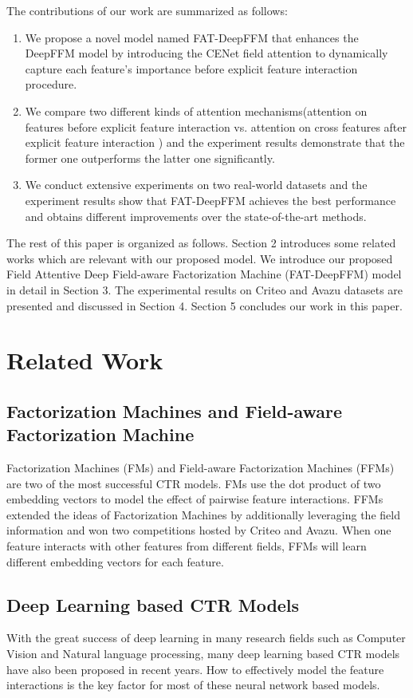 \documentclass{article}
\begin{document}
The contributions of our work are summarized as follows:
\begin{enumerate}[label=\arabic*)]
\item 	We propose a novel model named FAT-DeepFFM that enhances the DeepFFM model by introducing the CENet  field attention to dynamically capture each feature's importance before explicit feature interaction procedure.
\item We compare two different kinds of attention mechanisms(attention on features before explicit feature interaction vs. attention on cross features after explicit feature interaction ) and the experiment results demonstrate that the former one outperforms the latter one significantly. 
\item We conduct extensive experiments on two real-world datasets and the experiment results show that FAT-DeepFFM achieves the best performance and obtains different improvements over the state-of-the-art methods.
\end{enumerate}

The rest of this paper is organized as follows. Section 2 introduces some related works which are relevant with our proposed model. We introduce our proposed Field Attentive Deep Field-aware Factorization Machine (FAT-DeepFFM) model in detail in Section 3. The experimental results on Criteo and Avazu datasets are presented and discussed in Section 4. Section 5 concludes our work in this paper. 

\section{Related Work}
\subsection{Factorization Machines and Field-aware Factorization Machine}
Factorization Machines (FMs) \cite{rendle2010factorization} and Field-aware Factorization Machines (FFMs) \cite{juan2016field} are two of the most successful CTR models. FMs use the dot product of two embedding vectors to model the effect of pairwise feature interactions. FFMs extended the ideas of Factorization Machines by additionally leveraging the field information and won two competitions hosted by Criteo and Avazu. When one feature interacts with other features from different fields, FFMs will learn different embedding vectors for each feature.

\subsection{Deep Learning based CTR Models}
With the great success of deep learning in many research fields such as Computer Vision and Natural language processing, many deep learning based CTR models have also been proposed in recent years. How to effectively model the feature interactions is the key factor for most of these neural network based models.
\end{document}
